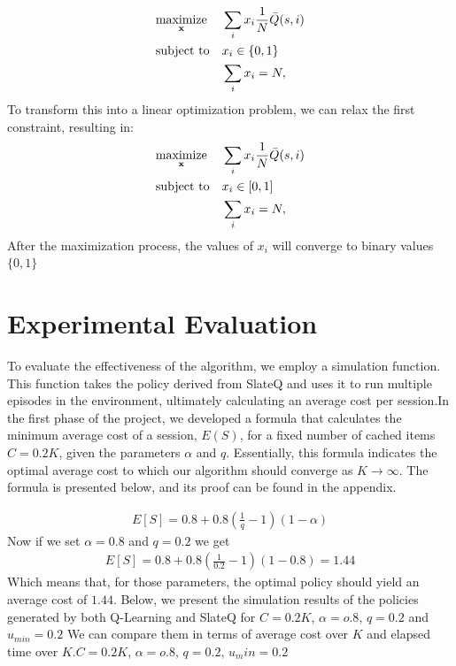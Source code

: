 \documentclass[12pt]{article}
\begin{document}
\begin{equation}
\begin{aligned}
& \underset{\bf x}{\text{maximize}}
& & \sum_i x_i\frac{1}{N}\bar{Q}(s,i) \\
& \text{subject to}
& &x_i \in \{0,1\} \\
& & & \sum_{i} x_i = N,
\end{aligned}
\end{equation}To transform this into a linear optimization problem, we can relax the first constraint, resulting in: 
\begin{equation}
    \begin{aligned}
    & \underset{\bf x}{\text{maximize}}
    & & \sum_i x_i\frac{1}{N}\bar{Q}(s,i) \\
    & \text{subject to}
    & &x_i \in [0,1] \\
    & & & \sum_{i} x_i = N,
    \end{aligned}
    \end{equation}
After the maximization process, the values of $x_i$ will converge to binary values  $\{0,1\}$

\section*{{\bf Experimental Evaluation}}

To evaluate the effectiveness of the algorithm, we employ a simulation function. This function 
takes the policy derived from SlateQ and uses it to run multiple episodes in the environment, 
ultimately calculating an average cost per session.In the first phase of the project, 
we developed a formula that calculates the minimum average cost of a session, $E(S)$, 
for a fixed number of cached items $C=0.2K$, given the parameters $\alpha$ and $q$. Essentially, 
this formula indicates the optimal average cost to which our algorithm should converge as $K \rightarrow \infty$. 
The formula is presented below, and its proof can be found in the appendix.

\begin{align*}
    E[S] = 0.8 + 0.8(\frac{1}{q}-1)(1-\alpha) \tag{3}
\end{align*}
Now if we set $\alpha = 0.8$ and $q=0.2$ we get
\begin{align*}
    E[S] = 0.8 + 0.8(\frac{1}{0.2}-1)(1-0.8) = 1.44 
\end{align*}
Which means that, for those parameters, the optimal policy should yield an average cost of $1.44$. Below, 
we present the simulation results of the policies generated by both Q-Learning and SlateQ for $C=0.2K$, $\alpha = o.8$, $q= 0.2$ and $u_{min} = 0.2$ We can compare them in 
terms of average cost over $K$ and elapsed time over $K$.$C=0.2K$, $\alpha = o.8$, $q= 0.2$, $u_min = 0.2$
\end{document}
